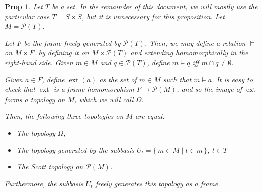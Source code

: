 \documentclass{article}
\theoremstyle{definition}
\theoremstyle{plain}
\newtheorem*{prop}{Prop}
\DeclareMathOperator{\ext}{ext}
\newcommand{\ps}{\mathcal{P}}
\begin{document}
\begin{prop}
Let $T$ be a set. In the remainder of this document, we will mostly use the particular case $T = S \times S$, but it is unnecessary for this proposition. Let $M = \ps(T)$.

Let $F$ be the frame freely generated by $\ps(T)$. Then, we may define a relation $\vDash$ on $M \times F$. by defining it on $M \times \ps(T)$ and extending homomorphically in the right-hand side. Given $m \in M$ and $q \in \ps(T)$, define $m \vDash q$ iff $m \cap q \neq \emptyset$.

Given $a \in F$, define $\ext(a)$ as the set of $m \in M$ such that $m \vDash a$. It is easy to check that $\ext$ is a frame homomorphism $F \to \ps(M)$, and so the image of $\ext$ forms a topology on $M$, which we will call $\Omega$.

Then, the following three topologies on $M$ are equal:
\begin{itemize}
\item The topology $\Omega$,
\item The topology generated by the subbasis $U_{t} = \{\, m \in M \mid t \in m \,\}$, $t \in T$
\item The Scott topology on $\ps(M)$.
\end{itemize}

Furthermore, the subbasis $U_{t}$ freely generates this topology as a frame.
\end{prop}
\end{document}
